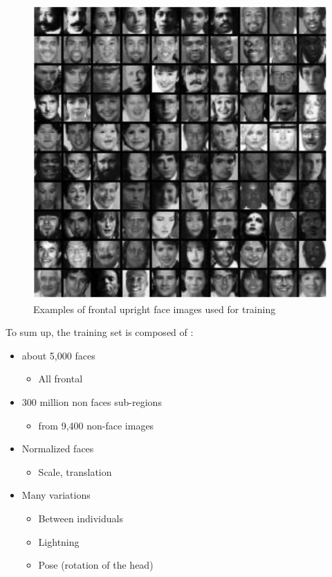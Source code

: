 \begin{figure}[!h]
\begin{center}
\noindent \includegraphics[scale=0.9]{figures/haar_feature_training_dataset} 
\newline
\caption{Examples of frontal upright face images used for training}
\label{haar_feature_training_dataset}
\end{center} 
\end{figure}

\noindent To sum up, the training set is composed of \cite{UBC01}:

\begin{itemize}
  \item about 5,000 faces
  \begin{itemize}
  	\item All frontal
  \end{itemize}
  \item 300 million non faces sub-regions
  \begin{itemize}
  	\item from 9,400 non-face images
  \end{itemize}
  \item Normalized faces
  \begin{itemize}
  	\item Scale, translation
  \end{itemize}
  \item Many variations
  \begin{itemize}
  	\item Between individuals
	\item Lightning
	\item Pose (rotation of the head)
  \end{itemize}
\end{itemize}

